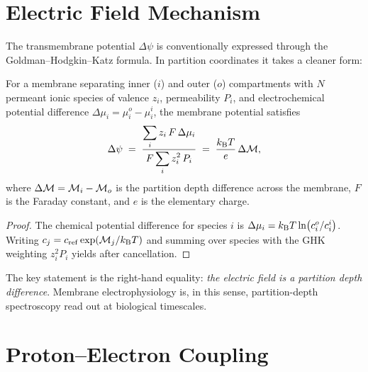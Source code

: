 \section{Electric Field Mechanism}
\label{sec:electric-field}

The transmembrane potential $\Delta\psi$ is conventionally expressed through the
Goldman--Hodgkin--Katz formula.  In partition coordinates it takes a cleaner
form:

\begin{theorem}
\label{thm:membrane-potential}
For a membrane separating inner ($i$) and outer ($o$) compartments with $N$
permeant ionic species of valence $z_i$, permeability $P_i$, and electrochemical
potential difference $\Delta\mu_i = \mu_i^o - \mu_i^i$, the membrane potential
satisfies
\begin{equation}
    \Delta\psi
    \;=\;
    \frac{\displaystyle\sum_i z_i\,F\,\Delta\mu_i}
         {\displaystyle F\sum_i z_i^2\,P_i}
    \;=\;
    \frac{k_{\mathrm{B}} T}{e}\,\Delta\mathcal{M},
    \label{eq:membrane-potential}
\end{equation}
where $\Delta\mathcal{M} = \mathcal{M}_i - \mathcal{M}_o$ is the partition depth difference
across the membrane, $F$ is the Faraday constant, and $e$ is the elementary charge.
\end{theorem}

\begin{proof}
The chemical potential difference for species $i$ is $\Delta\mu_i = k_{\mathrm{B}} T\ln(c_i^o/c_i^i)$.
Writing $c_j = c_\mathrm{ref}\exp(\mathcal{M}_j/k_{\mathrm{B}} T)$ and summing over species with
the GHK weighting $z_i^2 P_i$ yields  after
cancellation.
\end{proof}

The key statement is the right-hand equality: \emph{the electric field is a
partition depth difference}.  Membrane electrophysiology is, in this sense,
partition-depth spectroscopy read out at biological timescales.

\section{Proton--Electron Coupling}
\label{sec:proton-electron}

